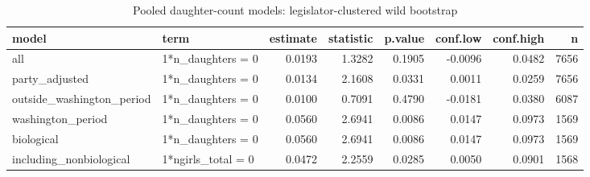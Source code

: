 \begin{table}

\caption{Pooled daughter-count models: legislator-clustered wild bootstrap}
\centering
\begin{tabular}[t]{llrrrrrr}
\toprule
model & term & estimate & statistic & p.value & conf.low & conf.high & n\\
\midrule
all & 1*n\_daughters = 0 & 0.0193 & 1.3282 & 0.1905 & -0.0096 & 0.0482 & 7656\\
party\_adjusted & 1*n\_daughters = 0 & 0.0134 & 2.1608 & 0.0331 & 0.0011 & 0.0259 & 7656\\
outside\_washington\_period & 1*n\_daughters = 0 & 0.0100 & 0.7091 & 0.4790 & -0.0181 & 0.0380 & 6087\\
washington\_period & 1*n\_daughters = 0 & 0.0560 & 2.6941 & 0.0086 & 0.0147 & 0.0973 & 1569\\
biological & 1*n\_daughters = 0 & 0.0560 & 2.6941 & 0.0086 & 0.0147 & 0.0973 & 1569\\
\addlinespace
including\_nonbiological & 1*ngirls\_total = 0 & 0.0472 & 2.2559 & 0.0285 & 0.0050 & 0.0901 & 1568\\
\bottomrule
\end{tabular}
\end{table}
